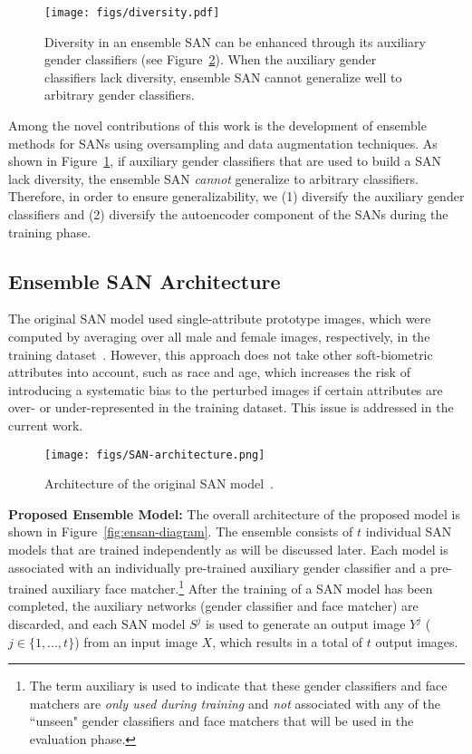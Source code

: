 \documentclass[10pt,twocolumn,letterpaper]{article}
\begin{document}
\begin{figure}
\begin{center}
   \texttt{[image: figs/diversity.pdf]}
\end{center}
   \caption{Diversity in an ensemble SAN can be enhanced through its auxiliary gender classifiers (see Figure~\ref{fig:san-arch}). When the auxiliary gender classifiers lack diversity, ensemble SAN cannot generalize well to arbitrary gender classifiers.}
\label{fig:diversity}
\end{figure}

Among the novel contributions of this work is the development of ensemble methods for SANs using oversampling and data augmentation techniques. As shown in Figure~\ref{fig:diversity}, if auxiliary gender classifiers that are used to build a SAN lack diversity, the ensemble SAN {\em cannot} generalize to arbitrary classifiers. Therefore, in order to ensure generalizability, we (1) diversify the auxiliary gender classifiers and (2) diversify the autoencoder component of the SANs during the training phase.

\subsection{Ensemble SAN Architecture}

The original SAN model used single-attribute prototype images, which were computed by averaging over all male and female images, respectively, in the training dataset~\cite{mirjalili_semi_2018}. 
However, this approach does not take other soft-biometric attributes into account, such as race and age, which increases the risk of introducing a systematic bias to the perturbed images if certain attributes are over- or under-represented in the training dataset. This issue is addressed in the current work. 

\begin{figure}
\begin{center}
   \texttt{[image: figs/SAN-architecture.png]}
\end{center}
   \caption{Architecture of the original SAN model~\cite{mirjalili_semi_2018}.}
\label{fig:san-arch}
\end{figure}

{\bf Proposed Ensemble Model:}  The overall architecture of the proposed model is shown in Figure~\ref{fig:ensan-diagram}. The ensemble consists of $t$ individual SAN models that are trained independently as will be discussed later. Each model is associated with an individually pre-trained auxiliary gender classifier and a pre-trained auxiliary face matcher.\footnote{The term auxiliary is used to indicate that these gender classifiers and face matchers are {\em only used during training} and {\em not} associated with any of the ``unseen" gender classifiers and face matchers that will be used in the evaluation phase.}  After the training of a SAN model has been completed, the auxiliary networks (gender classifier and face matcher) are discarded, and each SAN model $S^j$ is used to generate an output image $Y^j$ ($j \in \{1, ..., t\}$) from an input image $X$, which results in a total of $t$ output images.
\end{document}
